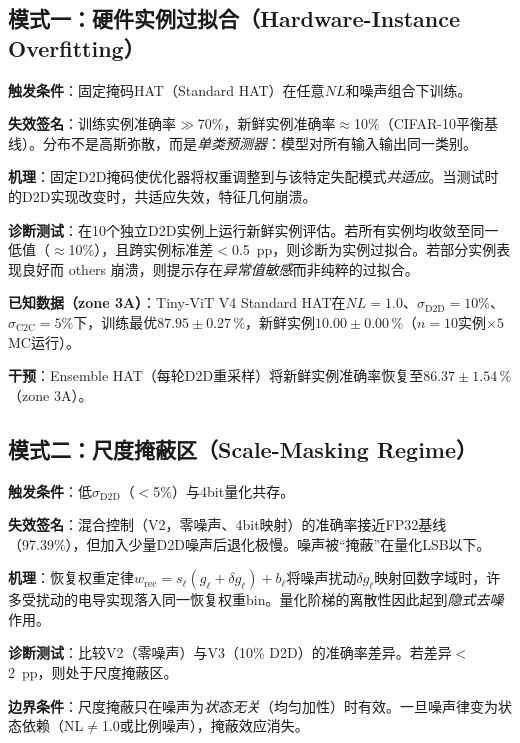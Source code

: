 \subsection{模式一：硬件实例过拟合（Hardware-Instance Overfitting）}
\label{subsec:failure_instance_overfitting}

\textbf{触发条件}：固定掩码HAT（Standard HAT）在任意$NL$和噪声组合下训练。

\textbf{失效签名}：训练实例准确率$\gg$70\%，新鲜实例准确率$\approx$10\%（CIFAR-10平衡基线）。分布不是高斯弥散，而是\emph{单类预测器}：模型对所有输入输出同一类别。

\textbf{机理}：固定D2D掩码使优化器将权重调整到与该特定失配模式\emph{共适应}。当测试时的D2D实现改变时，共适应失效，特征几何崩溃。

\textbf{诊断测试}：在10个独立D2D实例上运行新鲜实例评估。若所有实例均收敛至同一低值（$\approx$10\%），且跨实例标准差$<$0.5~pp，则诊断为实例过拟合。若部分实例表现良好而 others 崩溃，则提示存在\emph{异常值敏感}而非纯粹的过拟合。

\textbf{已知数据（zone 3A）}：Tiny-ViT V4 Standard HAT在$NL=1.0$、$\sigma_{\mathrm{D2D}}=10\%$、$\sigma_{\mathrm{C2C}}=5\%$下，训练最优$87.95\pm0.27\,\%$，新鲜实例$10.00\pm0.00\,\%$（$n=10$实例$\times5$ MC运行）。

\textbf{干预}：Ensemble HAT（每轮D2D重采样）将新鲜实例准确率恢复至$86.37\pm1.54\,\%$（zone 3A）。

\subsection{模式二：尺度掩蔽区（Scale-Masking Regime）}
\label{subsec:failure_scale_masking}

\textbf{触发条件}：低$\sigma_{\mathrm{D2D}}$（$<$5\%）与4bit量化共存。

\textbf{失效签名}：混合控制（V2，零噪声、4bit映射）的准确率接近FP32基线（97.39\%），但加入少量D2D噪声后退化极慢。噪声被“掩蔽”在量化LSB以下。

\textbf{机理}：恢复权重定律$w_{\mathrm{rec}} = s_{\ell}(g_{\ell} + \delta g_{\ell}) + b_{\ell}$将噪声扰动$\delta g_{\ell}$映射回数字域时，许多受扰动的电导实现落入同一恢复权重bin。量化阶梯的离散性因此起到\emph{隐式去噪}作用。

\textbf{诊断测试}：比较V2（零噪声）与V3（10\% D2D）的准确率差异。若差异$<$2~pp，则处于尺度掩蔽区。

\textbf{边界条件}：尺度掩蔽只在噪声为\emph{状态无关}（均匀加性）时有效。一旦噪声律变为状态依赖（NL$\neq$1.0或比例噪声），掩蔽效应消失。

